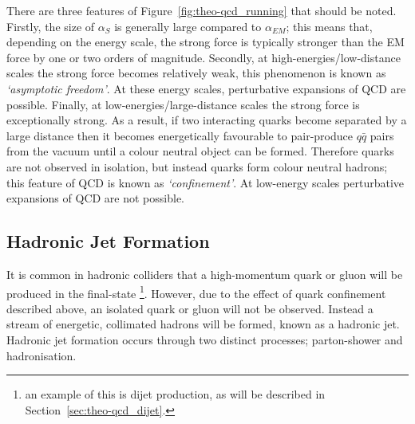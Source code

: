 There are three features of Figure~\ref{fig:theo-qcd_running} that should be noted.
Firstly, the size of $\alpha_S$ is generally large compared to $\alpha_{EM}$;
this means that, depending on the energy scale, the strong force is typically stronger than the EM force by one or two orders of magnitude.
Secondly, at high-energies/low-distance scales the strong force becomes relatively weak, this phenomenon is known as
\textit{`asymptotic freedom'}.
At these energy scales, perturbative expansions of QCD are possible.
Finally, at low-energies/large-distance scales the strong force is exceptionally strong.
As a result, if two interacting quarks become separated by a large distance then it becomes energetically favourable to
pair-produce $q\bar{q}$ pairs from the vacuum until a colour neutral object can be formed.
Therefore quarks are not observed in isolation, but instead quarks form colour neutral hadrons; this feature of QCD is known as \textit{`confinement'}.
At low-energy scales perturbative expansions of QCD are not possible.

\subsection{Hadronic Jet Formation}
\label{sec:theo-qcd_jets}

It is common in hadronic colliders that a high-momentum quark or gluon will be produced in the final-state
\footnote{an example of this is dijet production, as will be described in Section~\ref{sec:theo-qcd_dijet}.}.
However, due to the effect of quark confinement described above, an isolated quark or gluon will not be observed.
Instead a stream of energetic, collimated hadrons will be formed, known as a hadronic jet.
Hadronic jet formation occurs through two distinct processes; parton-shower and hadronisation.

